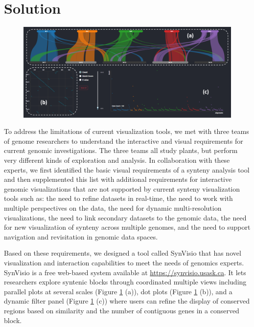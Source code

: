 \section{Solution}

\begin{figure}
  \centering
  \includegraphics[width=1\linewidth]{images/ch_1_dashboard.PNG}
  \label{fig:ch_1_dashboard}
\end{figure}

To address the limitations of current visualization tools, we met with three teams of genome researchers to understand the interactive and visual requirements for current genomic investigations. The three teams all study plants, but perform very different kinds of exploration and analysis. In collaboration with these experts, we first identified the basic visual requirements of a synteny analysis tool and then supplemented  this list with additional requirements for interactive genomic visualizations that are not supported by current synteny visualization tools such as: the need to refine datasets in real-time, the need to work with multiple perspectives on the data, the need for dynamic multi-resolution visualizations, the need to link secondary datasets to the genomic data, the need for new visualization of synteny across multiple genomes, and the need to support navigation and revisitation in genomic data spaces.

Based on these requirements, we designed a tool called SynVisio that has novel visualization and interaction capabilities to meet the needs of genomics experts. SynVisio is a free web-based system available at \url{https://synvisio.usask.ca}. It lets researchers explore syntenic blocks through coordinated multiple views including parallel plots at several scales (Figure \ref{fig:ch_1_dashboard} (a)), dot plots (Figure \ref{fig:ch_1_dashboard} (b)), and a dynamic filter panel (Figure \ref{fig:ch_1_dashboard} (c)) where users can refine the display of conserved regions based on similarity and the number of contiguous genes in a conserved block.

